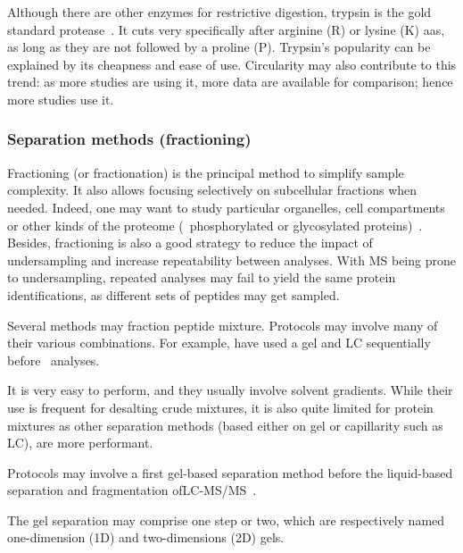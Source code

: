 Although there are other enzymes for restrictive digestion,
trypsin is the gold standard protease~.
It cuts very specifically after arginine (R) or lysine (K) \glspl{aa},
as long as they are not followed by a proline (P).
Trypsin's popularity can be explained by its cheapness and ease of use.
Circularity may also contribute to this trend:
as more studies are using it, more data are available for comparison;
hence more studies use it.\mybr\

\subsubsection{Separation methods (fractioning)}\label{subsub:sepMethods}
Fractioning (or fractionation) is the principal method to simplify sample complexity.
It also allows focusing selectively on subcellular fractions when needed. Indeed, one may want
to study particular organelles, cell compartments or other kinds of the proteome
(\eg\ phosphorylated or glycosylated proteins)~. Besides,
fractioning is also a good strategy to reduce the impact of undersampling and
increase repeatability between analyses.
With \gls{MS} being prone to undersampling,
repeated analyses may fail to yield the same
protein identifications,
as different sets of peptides may get sampled.\mybr\

Several methods may fraction peptide mixture.
Protocols may involve many of their various combinations.
For example, \citet{PandeyData,KusterData}
have used a gel and \gls{LC} sequentially before \ms\ analyses.\mybr\

It is very easy to perform, and they usually involve solvent gradients. While
their use is frequent for desalting crude mixtures, it is also quite limited
for protein mixtures as other separation methods (based either on gel or
capillarity such as \gls{LC}), are more performant.\mybr\

Protocols may involve a first gel-based separation method before the
liquid-based separation and fragmentation of\enspace\gls{LC-MS/MS}~.\mybr\

The gel separation may comprise one step or two, which are respectively named
one-dimension (1D) and two-dimensions (2D) gels.\mybr\


